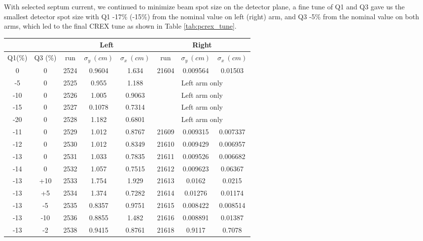 With selected septum current, we continued to minimize beam spot size on the detector
plane, a fine tune of Q1 and Q3 gave us the smallest detector spot size with
Q1 -17\% (-15\%) from the nominal value on left (right) arm, and Q3 -5\% from
the nominal value on both arms, which led to the final CREX tune as shown in
Table \ref{tab:pcrex_tune}.
\begin{table}[h!]
    \begin{tabular}{c c | c c c | c c c}
	\hline
	& & \multicolumn{3}{c}{Left} & \multicolumn{3}{c}{Right}  \\
	\hline
	Q1(\%)  & Q3 (\%)    & run   & $\sigma_y\ (cm)$  & $\sigma_x\ (cm)$   & run   & $\sigma_y\ (cm)$    & $\sigma_x\ (cm)$    \\
	\hline
	0   & 0	    & 2524  & 0.9604	& 1.634	    & 21604	& 0.009564  & 0.01503 \\
	-5  & 0	    & 2525  & 0.955	& 1.188	    & \multicolumn{3}{c}{Left arm only}    \\
	-10 & 0	    & 2526  & 1.005	& 0.9063    & \multicolumn{3}{c}{Left arm only}    \\ 
	-15 & 0	    & 2527  & 0.1078	& 0.7314    & \multicolumn{3}{c}{Left arm only}    \\ 
	-20 & 0	    & 2528  & 1.182	& 0.6801    & \multicolumn{3}{c}{Left arm only}    \\ 
	\hline                              
	-11 & 0	    & 2529  & 1.012	& 0.8767    & 21609	& 0.009315  & 0.007337	\\
	-12 & 0	    & 2530  & 1.012	& 0.8349    & 21610	& 0.009429  & 0.006957  \\
	-13 & 0	    & 2531  & 1.033	& 0.7835    & 21611	& 0.009526  & 0.006682  \\
	-14 & 0	    & 2532  & 1.057	& 0.7515    & 21612	& 0.009623  & 0.06367   \\
	\hline                              
	-13 & +10   & 2533  & 1.754	& 1.929	    & 21613	& 0.0162    & 0.0215    \\
	-13 & +5    & 2534  & 1.374	& 0.7282    & 21614	& 0.01276   & 0.01174   \\
	-13 & -5    & 2535  & 0.8357	& 0.9751    & 21615	& 0.008422  & 0.008514  \\
	-13 & -10   & 2536  & 0.8855	& 1.482	    & 21616	& 0.008891  & 0.01387   \\
	\hline
	-13 & -2    & 2538  & 0.9415	& 0.8761    & 21618	& 0.9117    & 0.7078  \\

\end{tabular}
\end{table}
